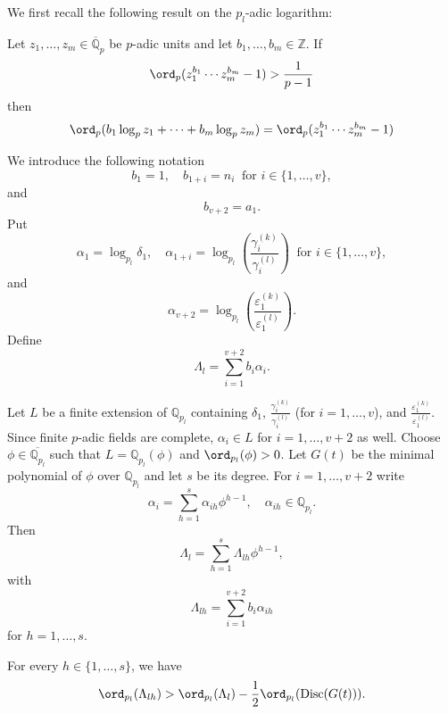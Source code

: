 {We first recall the following result on the $p_l$-adic logarithm:

\begin{lemma}\label{Lem:padic}
Let $z_1, \dots, z_m \in \overline{\mathbb{Q}}_p$ be $p$-adic units and let $b_1, \dots, b_m \in \mathbb{Z}$. If
\[\ord_p(z_1^{b_1}\cdots z_m^{b_m} - 1) > \frac{1}{p-1}\]
then
\[\ord_p(b_1\log_p z_1 + \cdots + b_m \log_p z_m) = \ord_p(z_1^{b_1}\cdots z_m^{b_m} - 1) \]
\end{lemma}

We introduce the following notation
\[b_1 = 1, \quad b_{1+i} = n_i \ \text{ for } i \in \{1, \dots, v\},\]
and
\[ b_{v+2} = a_1.\]
Put
\[\alpha_1 = \log_{p_l} \delta_1, \quad \alpha_{1+i} = \log_{p_l}\left( \frac{\gamma_i^{(k)}}{\gamma_i^{(l)}}\right)  \ \text{ for } i \in \{1, \dots, v\},\]
and
\[\alpha_{v+2} = \log_{p_l}\left( \frac{\varepsilon_1^{(k)}}{\varepsilon_1^{(l)}}\right).\]
Define
\[\Lambda_l = \sum_{i = 1}^{v+2} b_i\alpha_i.\]

Let $L$ be a finite extension of $\mathbb{Q}_{p_l}$ containing $\delta_1$, $\frac{\gamma_i^{(k)}}{\gamma_i^{(l)}}$ (for $i = 1, \dots, v$), and $ \frac{\varepsilon_1^{(k)}}{\varepsilon_1^{(l)}}$. Since finite $p$-adic fields are complete, $\alpha_i \in L$ for $i = 1, \dots, v+2$ as well. Choose $\phi \in \overline{\mathbb{Q}_{p_l}}$ such that $L = \mathbb{Q}_{p_l}(\phi)$ and $\ord_{p_l}(\phi) > 0 $. Let $G(t)$ be the minimal polynomial of $\phi$ over $\mathbb{Q}_{p_l}$ and let $s$ be its degree. For $i = 1, \dots, v+2$ write
\[\alpha_i = \sum_{h = 1}^s \alpha_{ih}\phi^{h - 1}, \quad \alpha_{ih} \in \mathbb{Q}_{p_l}.\]
Then
\begin{equation} \label{Eq:lambdalh}
\Lambda_l = \sum_{h = 1}^s \Lambda_{lh}\phi^{h-1},
\end{equation}
with
\[\Lambda_{lh} = \sum_{i = 1}^{v+2} b_i \alpha_{ih}\]
for $h = 1, \dots, s$. 

\begin{lemma}\label{Lem:discG}
For every $h \in \{1, \dots, s\}$, we have
\[\ord_{p_l}(\Lambda_{lh}) > \ord_{p_l}(\Lambda_l) - \frac{1}{2}\ord_{p_l}(\text{Disc}(G(t))).\]
\end{lemma}

}
